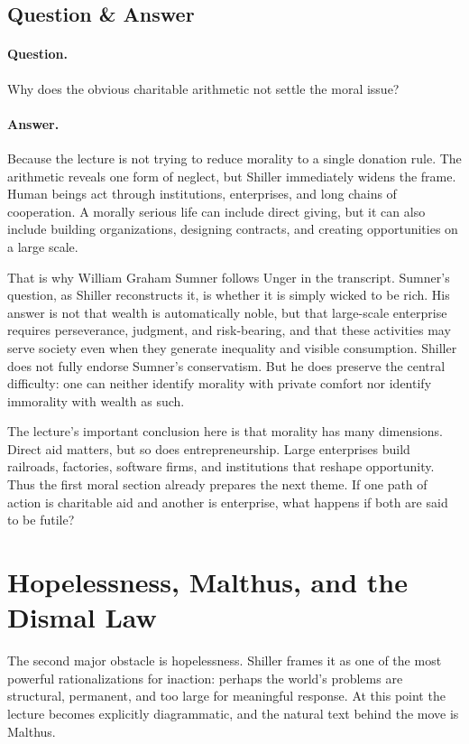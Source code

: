 \subsection{Question \& Answer}

\paragraph{Question.} Why does the obvious charitable arithmetic not settle the moral issue?

\paragraph{Answer.} Because the lecture is not trying to reduce morality to a single donation rule. The arithmetic reveals one form of neglect, but Shiller immediately widens the frame. Human beings act through institutions, enterprises, and long chains of cooperation. A morally serious life can include direct giving, but it can also include building organizations, designing contracts, and creating opportunities on a large scale.

That is why William Graham Sumner follows Unger in the transcript. Sumner's question, as Shiller reconstructs it, is whether it is simply wicked to be rich. His answer is not that wealth is automatically noble, but that large-scale enterprise requires perseverance, judgment, and risk-bearing, and that these activities may serve society even when they generate inequality and visible consumption. Shiller does not fully endorse Sumner's conservatism. But he does preserve the central difficulty: one can neither identify morality with private comfort nor identify immorality with wealth as such.

The lecture's important conclusion here is that morality has many dimensions. Direct aid matters, but so does entrepreneurship. Large enterprises build railroads, factories, software firms, and institutions that reshape opportunity. Thus the first moral section already prepares the next theme. If one path of action is charitable aid and another is enterprise, what happens if both are said to be futile?

\section{Hopelessness, Malthus, and the Dismal Law}

The second major obstacle is hopelessness. Shiller frames it as one of the most powerful rationalizations for inaction: perhaps the world's problems are structural, permanent, and too large for meaningful response. At this point the lecture becomes explicitly diagrammatic, and the natural text behind the move is Malthus.

